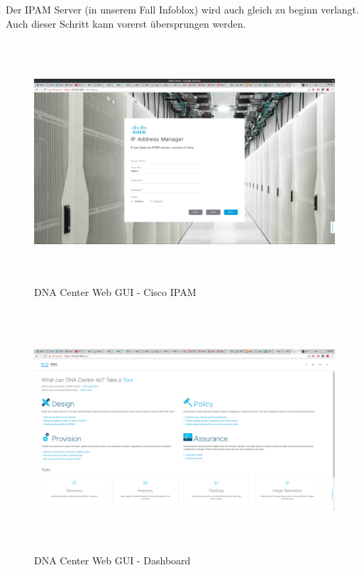 Der IPAM Server (in unserem Fall Infoblox) wird auch gleich zu beginn verlangt. Auch dieser Schritt kann vorerst übersprungen werden.

\begin{figure}[H]
	\centering
	\includegraphics[height=9cm]{img/sc_007.png}
	\caption{DNA Center Web GUI - Cisco IPAM}
	\label{fig:dna-center-gui-3}
\end{figure}

\begin{figure}[H]
	\centering
	\includegraphics[height=9cm]{img/sc_008.png}
	\caption{DNA Center Web GUI - Dashboard}
	\label{fig:dna-center-gui-4}
\end{figure}

